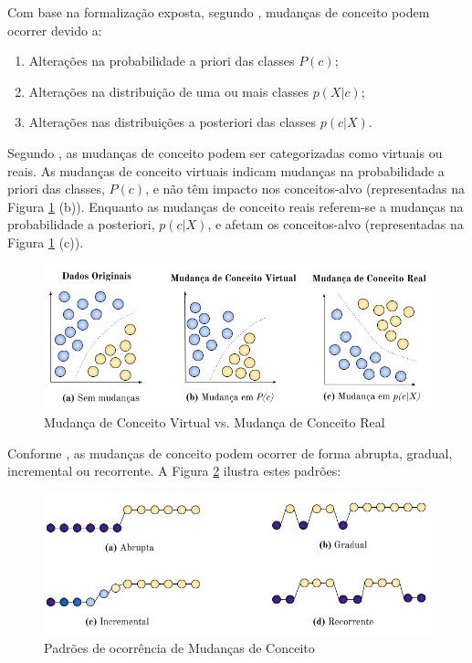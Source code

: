 \documentclass[qual, classic, a4paper]{ufbathesis}
\begin{document}
Com base na formalização exposta, segundo \cite{Zliobaite:2010}, mudanças de conceito podem ocorrer devido a:

\begin{enumerate}
    \item Alterações na probabilidade a priori das classes $P(c)$;
    \item Alterações na distribuição de uma ou mais classes $p(X|c)$;
    \item Alterações nas distribuições a posteriori das classes $p(c|X)$.
\end{enumerate}

Segundo \cite{Zliobaite:2010, Gama:2014:SCD:2597757.2523813}, as mudanças de conceito podem ser categorizadas como virtuais ou reais.
As mudanças de conceito virtuais indicam mudanças na probabilidade a priori das classes, $P(c)$, e não têm impacto nos conceitos-alvo (representadas na Figura \ref{fig:real_and_virtual_concept_drift} (b)).
Enquanto as mudanças de conceito reais referem-se a mudanças na probabilidade a posteriori, $p(c|X)$, e afetam os conceitos-alvo (representadas na Figura \ref{fig:real_and_virtual_concept_drift} (c)).

\begin{figure}[H]
\begin{center}
    \includegraphics[scale=0.8]{imagens/concept_drift.png}
    \caption{Mudança de Conceito Virtual vs. Mudança de Conceito Real}
    \label{fig:real_and_virtual_concept_drift}
\end{center}
\end{figure}

Conforme \cite{Gama:2014:SCD:2597757.2523813}, as mudanças de conceito podem ocorrer de forma abrupta, gradual, incremental ou recorrente.
A Figura \ref{fig:concept_drift_patterns} ilustra estes padrões:

\begin{figure}[H]
\begin{center}
    \includegraphics[scale=0.8]{imagens/concept_drift_patterns.png}
    \caption{Padrões de ocorrência de Mudanças de Conceito}
    \label{fig:concept_drift_patterns}
\end{center}
\end{figure}
\end{document}
